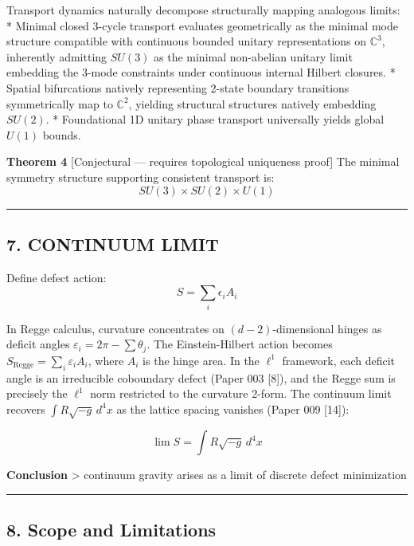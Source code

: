 \documentclass[
]{article}
\begin{document}
Transport dynamics naturally decompose structurally mapping analogous
limits: * Minimal closed 3-cycle transport evaluates geometrically as
the minimal mode structure compatible with continuous bounded unitary
representations on \(\mathbb{C}^3\), inherently admitting \(SU(3)\) as
the minimal non-abelian unitary limit embedding the 3-mode constraints
under continuous internal Hilbert closures. * Spatial bifurcations
natively representing 2-state boundary transitions symmetrically map to
\(\mathbb{C}^2\), yielding structural structures natively embedding
\(SU(2)\). * Foundational 1D unitary phase transport universally yields
global \(U(1)\) bounds.

\textbf{Theorem 4} {[}Conjectural --- requires topological uniqueness
proof{]} The minimal symmetry structure supporting consistent transport
is: \[
SU(3) \times SU(2) \times U(1)
\]

\begin{center}\rule{0.5\linewidth}{0.5pt}\end{center}

\subsection{7. CONTINUUM LIMIT}\label{continuum-limit}

Define defect action: \[
S = \sum_i \epsilon_i A_i
\]

In Regge calculus, curvature concentrates on \((d{-}2)\)-dimensional
hinges as deficit angles \(\varepsilon_i = 2\pi - \sum \theta_j\). The
Einstein-Hilbert action becomes
\(S_{\text{Regge}} = \sum_i \varepsilon_i A_i\), where \(A_i\) is the
hinge area. In the \(\ell^1\) framework, each deficit angle is an
irreducible coboundary defect (Paper 003 {[}8{]}), and the Regge sum is
precisely the \(\ell^1\) norm restricted to the curvature 2-form. The
continuum limit recovers \(\int R\sqrt{-g}\,d^4x\) as the lattice
spacing vanishes (Paper 009 {[}14{]}):

\[
\lim S = \int R \sqrt{-g} \, d^4x
\]

\textbf{Conclusion} \textgreater{} continuum gravity arises as a limit
of discrete defect minimization

\begin{center}\rule{0.5\linewidth}{0.5pt}\end{center}

\subsection{8. Scope and Limitations}\label{scope-and-limitations}
\end{document}
